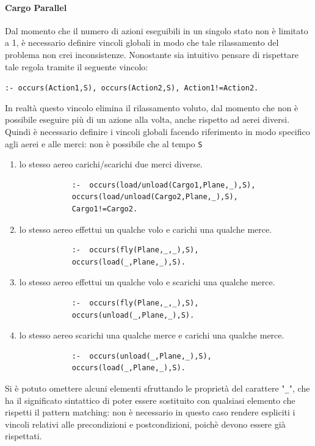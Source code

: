 \documentclass[a4paper,oneside,12pt]{book}
\begin{document}
    \paragraph*{Cargo Parallel\\}
    Dal momento che il numero di azioni eseguibili in un singolo stato non è limitato a 1, è necessario
    definire vincoli globali in modo che tale rilassamento del problema non crei inconsistenze.
    Nonostante sia intuitivo pensare di rispettare tale regola tramite il seguente vincolo:
    \begin{center}
        \texttt{:- occurs(Action1,S), occurs(Action2,S), Action1!=Action2.}
    \end{center}
    In realtà questo vincolo elimina il rilassamento voluto, dal momento che non è possibile eseguire
    più di un azione alla volta, anche rispetto ad aerei diversi.
    Quindi è necessario definire i vincoli globali facendo riferimento in modo specifico agli aerei e alle merci:
    non è possibile che al tempo \texttt{S}
    \begin{enumerate}

        \item lo stesso aereo carichi/scarichi due merci diverse.
        \begin{verbatim}
            :-  occurs(load/unload(Cargo1,Plane,_),S),
            occurs(load/unload(Cargo2,Plane,_),S),
            Cargo1!=Cargo2.
        \end{verbatim}
        \item lo stesso aereo effettui un qualche volo e carichi una qualche merce.
        \begin{verbatim}
            :-  occurs(fly(Plane,_,_),S),
            occurs(load(_,Plane,_),S).
        \end{verbatim}
        \item lo stesso aereo effettui un qualche volo e scarichi una qualche merce.
        \begin{verbatim}
            :-  occurs(fly(Plane,_,_),S),
            occurs(unload(_,Plane,_),S).
        \end{verbatim}
        \item lo stesso aereo scarichi una qualche merce e carichi una qualche merce.
        \begin{verbatim}
            :-  occurs(unload(_,Plane,_),S),
            occurs(load(_,Plane,_),S).
        \end{verbatim}
    \end{enumerate}
    Si è potuto omettere alcuni elementi sfruttando le proprietà del carattere "\texttt{\_}",
    che ha il significato sintattico di poter essere sostituito con qualsiasi elemento che rispetti
    il pattern matching: non è necessario in questo caso rendere espliciti i vincoli relativi
    alle precondizioni e postcondizioni, poichè devono essere già rispettati.
\end{document}
